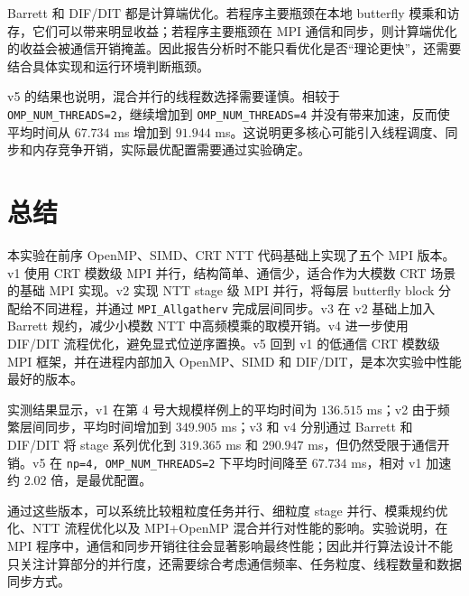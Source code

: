 \documentclass[a4paper]{article}
\begin{document}
Barrett 和 DIF/DIT 都是计算端优化。若程序主要瓶颈在本地 butterfly 模乘和访存，它们可以带来明显收益；若程序主要瓶颈在 MPI 通信和同步，则计算端优化的收益会被通信开销掩盖。因此报告分析时不能只看优化是否“理论更快”，还需要结合具体实现和运行环境判断瓶颈。

v5 的结果也说明，混合并行的线程数选择需要谨慎。相较于 \texttt{OMP\_NUM\_THREADS=2}，继续增加到 \texttt{OMP\_NUM\_THREADS=4} 并没有带来加速，反而使平均时间从 $67.734$ ms 增加到 $91.944$ ms。这说明更多核心可能引入线程调度、同步和内存竞争开销，实际最优配置需要通过实验确定。

\section{总结}

本实验在前序 OpenMP、SIMD、CRT NTT 代码基础上实现了五个 MPI 版本。v1 使用 CRT 模数级 MPI 并行，结构简单、通信少，适合作为大模数 CRT 场景的基础 MPI 实现。v2 实现 NTT stage 级 MPI 并行，将每层 butterfly block 分配给不同进程，并通过 \texttt{MPI\_Allgatherv} 完成层间同步。v3 在 v2 基础上加入 Barrett 规约，减少小模数 NTT 中高频模乘的取模开销。v4 进一步使用 DIF/DIT 流程优化，避免显式位逆序置换。v5 回到 v1 的低通信 CRT 模数级 MPI 框架，并在进程内部加入 OpenMP、SIMD 和 DIF/DIT，是本次实验中性能最好的版本。

实测结果显示，v1 在第 4 号大规模样例上的平均时间为 $136.515$ ms；v2 由于频繁层间同步，平均时间增加到 $349.905$ ms；v3 和 v4 分别通过 Barrett 和 DIF/DIT 将 stage 系列优化到 $319.365$ ms 和 $290.947$ ms，但仍然受限于通信开销。v5 在 \texttt{np=4, OMP\_NUM\_THREADS=2} 下平均时间降至 $67.734$ ms，相对 v1 加速约 $2.02$ 倍，是最优配置。

通过这些版本，可以系统比较粗粒度任务并行、细粒度 stage 并行、模乘规约优化、NTT 流程优化以及 MPI+OpenMP 混合并行对性能的影响。实验说明，在 MPI 程序中，通信和同步开销往往会显著影响最终性能；因此并行算法设计不能只关注计算部分的并行度，还需要综合考虑通信频率、任务粒度、线程数量和数据同步方式。
\end{document}
